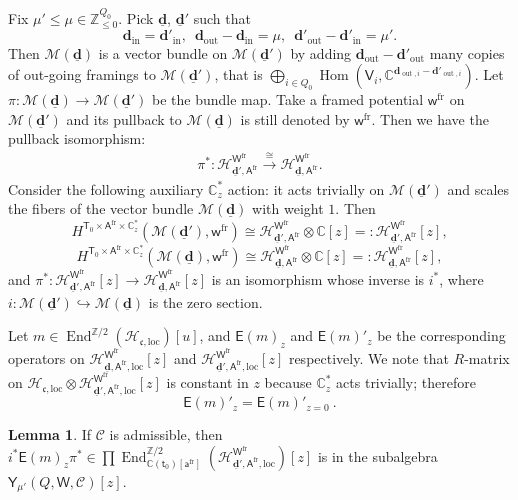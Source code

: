 \documentclass[10pt]{amsart}
\theoremstyle{definition}
\newtheorem{Lemma}[Theorem]{Lemma}
\numberwithin{equation}{section}
\newcommand{\bC}{\mathbb{C}}
\newcommand{\bZ}{\mathbb{Z}}
\newcommand{\bd}{\mathbf{d}}
\newcommand{\cH}{\mathcal{H}}
\newcommand{\cM}{\mathcal{M}}
\newcommand{\loc}{\mathrm{loc}}
\newcommand{\sA}{\mathsf{A}}
\newcommand{\sT}{\mathsf{T}}
\newcommand{\sW}{\mathsf{W}}
\newcommand{\sw}{\mathsf{w}}
\newcommand{\End}{\operatorname{End}}
\newcommand{\Hom}{\operatorname{Hom}}
\newcommand{\In}{\operatorname{in}}
\newcommand{\Out}{\operatorname{out}}
\begin{document}
Fix $\mu'\leqslant \mu\in \bZ_{\leqslant 0}^{Q_0}$. Pick $\underline{\bd}$, $\underline{\bd}'$ such that $$\bd_{\In}=\bd'_{\In},\,\,\,\bd_{\Out}-\bd_{\In}=\mu,\,\,\, \bd'_{\Out}-\bd'_{\In}=\mu'.$$ 
Then $\cM(\underline{\bd})$ is a vector bundle on $\cM(\underline{\bd}')$ by adding $\bd_{\Out}-\bd'_{\Out}$ many copies of out-going framings to $\cM(\underline{\bd}')$, that is $\bigoplus_{i\in Q_0}\Hom(\mathsf V_i,\bC^{\bd_{\Out,i}-\bd'_{\Out,i}})$. Let $\pi\colon \cM(\underline{\bd})\to \cM(\underline{\bd}')$ be the bundle map. Take a framed potential $\sw^{\mathrm{fr}}$ on $\cM(\underline{\bd}')$ and its pullback to $\cM(\underline{\bd})$ is still denoted by $\sw^{\mathrm{fr}}$. 
Then we have the pullback isomorphism: 
\begin{align*}
    \pi^*\colon \cH^{\sW^{\mathrm{fr}}}_{\underline{\bd}',\sA^{\mathrm{fr}}}\xrightarrow{\cong} \cH^{\sW^{\mathrm{fr}}}_{\underline{\bd},\sA^{\mathrm{fr}}}.
\end{align*}
Consider the following auxiliary $\bC^*_z$ action: it acts trivially on $\cM(\underline{\bd}')$ and scales the fibers of the vector bundle $\cM(\underline{\bd})$ with weight $1$. Then $$H^{\sT_0\times \sA^{\mathrm{fr}}\times \bC^*_z}(\cM(\underline{\bd}'),\sw^{\mathrm{fr}})\cong \cH^{\sW^{\mathrm{fr}}}_{\underline{\bd}',\sA^{\mathrm{fr}}}\otimes\bC[z]=: \cH^{\sW^{\mathrm{fr}}}_{\underline{\bd}',\sA^{\mathrm{fr}}}[z], $$  
$$H^{\sT_0\times \sA^{\mathrm{fr}}\times \bC^*_z}(\cM(\underline{\bd}),\sw^{\mathrm{fr}})\cong \cH^{\sW^{\mathrm{fr}}}_{\underline{\bd},\sA^{\mathrm{fr}}}\otimes\bC[z]=: \cH^{\sW^{\mathrm{fr}}}_{\underline{\bd},\sA^{\mathrm{fr}}}[z],$$ and $\pi^*\colon \cH^{\sW^{\mathrm{fr}}}_{\underline{\bd}',\sA^{\mathrm{fr}}}[z]\to \cH^{\sW^{\mathrm{fr}}}_{\underline{\bd},\sA^{\mathrm{fr}}}[z]$ is an isomorphism whose inverse  is $i^*$, where $i\colon \cM(\underline{\bd}')\hookrightarrow \cM(\underline{\bd})$ is the zero section.


Let $m\in \End^{\bZ/2}(\cH_{\mathfrak{c},\loc})[u]$, and $\mathsf E(m)_z$ and $\mathsf E(m)'_z$ be the corresponding operators on $\cH^{\sW^{\mathrm{fr}}}_{\underline{\bd},\sA^{\mathrm{fr}},\loc}[z]$ and $\cH^{\sW^{\mathrm{fr}}}_{\underline{\bd}',\sA^{\mathrm{fr}},\loc}[z]$ respectively. We note that $R$-matrix on $\cH_{\mathfrak{c},\loc}\otimes\cH^{\sW^{\mathrm{fr}}}_{\underline{\bd}',\sA^{\mathrm{fr}},\loc}[z]$ is constant in $z$ because $\bC^*_z$ acts trivially; therefore $$\mathsf E(m)'_z=\mathsf E(m)'_{z=0}\:.$$
\begin{Lemma}\label{lem shift map}
If $\mathcal C$ is admissible, then $i^*\mathsf E(m)_z\pi^*\in \prod \End^{\bZ/2}_{\bC(\mathsf t_0)[\mathsf a^{\mathrm{fr}}]}(\cH^{\sW^{\mathrm{fr}}}_{\underline{\bd}',\sA^{\mathrm{fr}},\loc})[z]$ is in the subalgebra $\mathsf Y_{\mu'}(Q,\sW,\mathcal C)[z]$. 
\end{Lemma}
\end{document}
